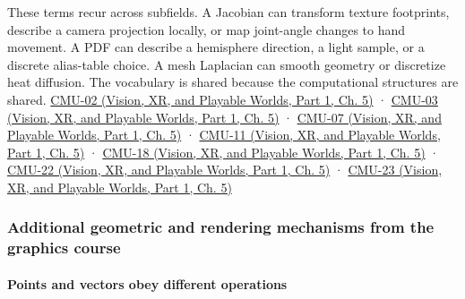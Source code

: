 These terms recur across subfields. A Jacobian can transform texture footprints, describe a camera projection locally, or map joint-angle changes to hand movement. A PDF can describe a hemisphere direction, a light sample, or a discrete alias-table choice. A mesh Laplacian can smooth geometry or discretize heat diffusion. The vocabulary is shared because the computational structures are shared. \href{../07-Vision-XR-and-Playable-Worlds-P01/main.pdf\#nameddest=04-visual-computing-ii-ch036-cmu-02---linear-algebra-preview}{CMU-02 (Vision, XR, and Playable Worlds, Part 1, Ch. 5)} · \href{../07-Vision-XR-and-Playable-Worlds-P01/main.pdf\#nameddest=04-visual-computing-ii-ch036-cmu-03---vector-calculus-preview}{CMU-03 (Vision, XR, and Playable Worlds, Part 1, Ch. 5)} · \href{../07-Vision-XR-and-Playable-Worlds-P01/main.pdf\#nameddest=04-visual-computing-ii-ch036-cmu-07---perspective-projection-and-texture-mapping}{CMU-07 (Vision, XR, and Playable Worlds, Part 1, Ch. 5)} · \href{../07-Vision-XR-and-Playable-Worlds-P01/main.pdf\#nameddest=04-visual-computing-ii-ch036-cmu-11---digital-geometry-processing}{CMU-11 (Vision, XR, and Playable Worlds, Part 1, Ch. 5)} · \href{../07-Vision-XR-and-Playable-Worlds-P01/main.pdf\#nameddest=04-visual-computing-ii-ch036-cmu-18---monte-carlo-rendering}{CMU-18 (Vision, XR, and Playable Worlds, Part 1, Ch. 5)} · \href{../07-Vision-XR-and-Playable-Worlds-P01/main.pdf\#nameddest=04-visual-computing-ii-ch036-cmu-22---optimization}{CMU-22 (Vision, XR, and Playable Worlds, Part 1, Ch. 5)} · \href{../07-Vision-XR-and-Playable-Worlds-P01/main.pdf\#nameddest=04-visual-computing-ii-ch036-cmu-23---physically-based-animation-and-pdes}{CMU-23 (Vision, XR, and Playable Worlds, Part 1, Ch. 5)}

\subsubsection{Additional geometric and rendering mechanisms from the graphics course}\label{03-visual-computing-i-ch001-additional-geometric-and-rendering-mechanisms-from-the-graphics-course}

\hypertarget{03-visual-computing-i-ch001-additional-geometric-and-rendering-mechanisms-from-the-graphics-course}{}

\paragraph{Points and vectors obey different operations}\label{03-visual-computing-i-ch001-points-and-vectors-obey-different-operations}

